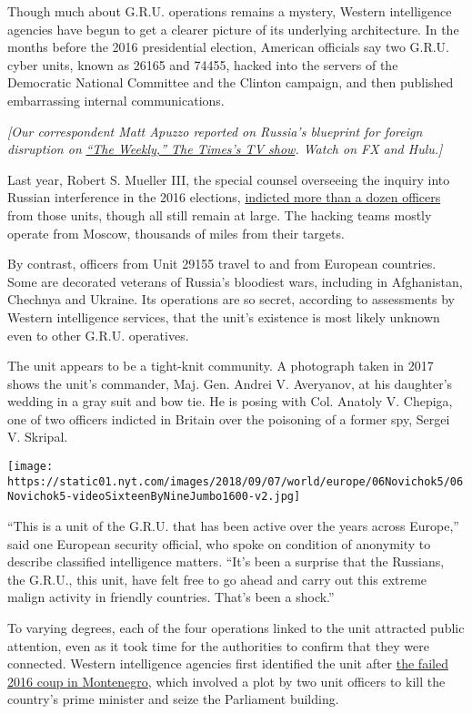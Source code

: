 Though much about G.R.U. operations remains a mystery, Western
intelligence agencies have begun to get a clearer picture of its
underlying architecture. In the months before the 2016 presidential
election, American officials say two G.R.U. cyber units, known as 26165
and 74455, hacked into the servers of the Democratic National Committee
and the Clinton campaign, and then published embarrassing internal
communications.

\emph{{[}Our correspondent Matt Apuzzo reported on Russia's blueprint
for foreign disruption on}
\href{https://www.nytimes.com/2019/09/06/the-weekly/russia-estonia-election-cyber-attack.html}{\emph{``The
Weekly,'' The Times's TV show}}\emph{. Watch on FX and Hulu.{]}}

Last year, Robert S. Mueller III, the special counsel overseeing the
inquiry into Russian interference in the 2016 elections,
\href{https://www.nytimes.com/2018/07/13/us/politics/mueller-indictment-russian-intelligence-hacking.html}{indicted
more than a dozen officers} from those units, though all still remain at
large. The hacking teams mostly operate from Moscow, thousands of miles
from their targets.

By contrast, officers from Unit 29155 travel to and from European
countries. Some are decorated veterans of Russia's bloodiest wars,
including in Afghanistan, Chechnya and Ukraine. Its operations are so
secret, according to assessments by Western intelligence services, that
the unit's existence is most likely unknown even to other G.R.U.
operatives.

The unit appears to be a tight-knit community. A photograph taken in
2017 shows the unit's commander, Maj. Gen. Andrei V. Averyanov, at his
daughter's wedding in a gray suit and bow tie. He is posing with Col.
Anatoly V. Chepiga, one of two officers indicted in Britain over the
poisoning of a former spy, Sergei V. Skripal.

\texttt{[image: https://static01.nyt.com/images/2018/09/07/world/europe/06Novichok5/06Novichok5-videoSixteenByNineJumbo1600-v2.jpg]}

``This is a unit of the G.R.U. that has been active over the years
across Europe,'' said one European security official, who spoke on
condition of anonymity to describe classified intelligence matters.
``It's been a surprise that the Russians, the G.R.U., this unit, have
felt free to go ahead and carry out this extreme malign activity in
friendly countries. That's been a shock.''

To varying degrees, each of the four operations linked to the unit
attracted public attention, even as it took time for the authorities to
confirm that they were connected. Western intelligence agencies first
identified the unit after
\href{https://www.nytimes.com/2016/11/26/world/europe/finger-pointed-at-russians-in-alleged-coup-plot-in-montenegro.html?module=inline}{the
failed 2016 coup in Montenegro}, which involved a plot by two unit
officers to kill the country's prime minister and seize the Parliament
building.

